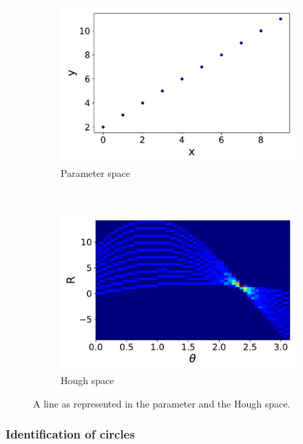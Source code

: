 \begin{figure}[ht]
	\centering
	\begin{subfigure}[b]{0.45\textwidth}
        \includegraphics[width=\textwidth]{figures/line.pdf}
        \caption{Parameter space}
    \end{subfigure}
		~ %
		\begin{subfigure}[b]{0.45\textwidth}
					\includegraphics[width=\textwidth]{figures/line_hough.pdf}
					\caption{Hough space}
			\end{subfigure}
	\label{HTLine}
	\caption{A line as represented in the parameter and the Hough space.}
\end{figure}

\subsubsection{Identification of circles}

